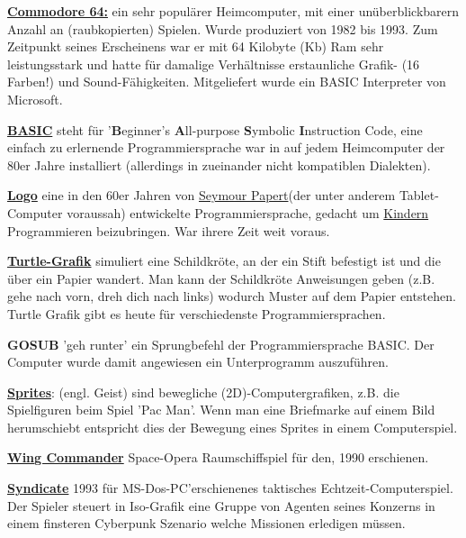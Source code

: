\documentclass[10pt,a4paper,ngerman,twoside]{article} %
\begin{document}
\href{https://de.wikipedia.org/wiki/Commodore_64}{\textbf{Commodore 64:}} ein sehr populärer Heimcomputer, mit einer unüberblickbarern Anzahl an (raubkopierten) Spielen. Wurde produziert von 1982 bis 1993. Zum Zeitpunkt seines Erscheinens war er mit 64 Kilobyte (Kb) Ram sehr leistungsstark und hatte für damalige Verhältnisse erstaunliche Grafik- (16 Farben!) und Sound-Fähigkeiten. Mitgeliefert wurde ein BASIC Interpreter von Microsoft.

\href{https://de.wikipedia.org/wiki/BASIC}{\textbf{BASIC}} steht für '\textbf{B}eginner’s \textbf{A}ll-purpose \textbf{S}ymbolic \textbf{I}nstruction Code, eine einfach zu erlernende Programmiersprache war in auf jedem Heimcomputer der 80er Jahre installiert (allerdings in zueinander nicht kompatiblen Dialekten). 

\href{https://de.wikipedia.org/wiki/Logo_(Programmiersprache)}{\textbf{Logo}} eine in den 60er Jahren von \href{https://de.wikipedia.org/wiki/Seymour_Papert}{Seymour Papert}(der unter anderem Tablet-Computer voraussah) entwickelte Programmiersprache, gedacht um \href{http://goo.gl/zJG9WU}{Kindern} Programmieren beizubringen. War ihrere Zeit weit voraus.

\href{https://de.wikipedia.org/wiki/Turtlegraphics}{\textbf{Turtle-Grafik}} simuliert eine Schildkröte, an der ein Stift befestigt ist und die über ein Papier wandert. Man kann der Schildkröte Anweisungen geben (z.B. gehe nach vorn, dreh dich nach links) wodurch Muster auf dem Papier entstehen. Turtle Grafik gibt es heute für verschiedenste Programmiersprachen.

\textbf{GOSUB} 'geh runter' ein Sprungbefehl der Programmiersprache BASIC. Der Computer wurde damit angewiesen ein Unterprogramm auszuführen.

\href{https://de.wikipedia.org/wiki/Sprite_(Computergrafik)}{\textbf{Sprites}}: (engl. Geist) sind bewegliche (2D)-Computergrafiken, z.B. die Spielfiguren beim Spiel 'Pac Man'.  Wenn man eine Briefmarke auf einem Bild herumschiebt entspricht dies der Bewegung eines Sprites in einem Computerspiel.

\href{https://de.wikipedia.org/wiki/Wing_Commander_(Computerspiel)}{\textbf{Wing Commander}} Space-Opera Raumschiffspiel für den, 1990 erschienen.

\href{https://de.wikipedia.org/wiki/Syndicate}{\textbf{Syndicate}} 1993 für MS-Dos-PC'erschienenes taktisches Echtzeit-Computerspiel. Der Spieler steuert in Iso-Grafik eine Gruppe von Agenten seines Konzerns in einem finsteren Cyberpunk Szenario welche Missionen erledigen müssen.
\end{document}

